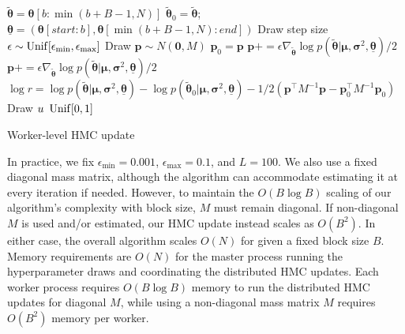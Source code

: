 \begin{algorithm}%

 $\bm{\tilde \theta} = \bm \theta[ b : \min(b + B - 1, N)]$\;
 $\bm{\tilde \theta}_0 = \bm{\tilde \theta}$;
 $\bm{\underline \theta} = (\bm \theta[start:b], \bm \theta[\min(b + B - 1, N):end])$\;
 Draw step size $\epsilon \sim \operatorname{Unif}[\epsilon_{\min}, \epsilon_{\max}]$\;
 Draw $\bm p \sim N(\bm 0, M)$\;
 $\bm p_0 = \bm p$\;
 $\bm p += \epsilon \nabla_{\bm{\tilde \theta}} \log p(\bm{\tilde \theta} | \bm \mu, \bm \sigma^2, \bm{\underline \theta}) / 2$\;
 $\bm p += \epsilon \nabla_{\bm{\tilde \theta}} \log p(\bm{\tilde \theta} | \bm \mu, \bm \sigma^2, \bm{\underline \theta}) / 2$\;
 $\log r = \log p(\bm{\tilde \theta} | \bm \mu, \bm \sigma^2, \bm{\underline \theta}) - \log p(\bm{\tilde \theta}_0 | \bm \mu, \bm \sigma^2, \bm{\underline \theta}) - 1/2( \bm p^\top M^{-1} \bm p - \bm p_0^\top M^{-1} \bm p_0)$\;
Draw $u ~ \operatorname{Unif}[0,1]$\;
 {
 
}
 \caption{Worker-level HMC update \label{supp:nucleosomes:alg:hmc}}
\end{algorithm}
%
In practice, we fix $\epsilon_{\min} = 0.001$, $\epsilon_{\max} = 0.1$, and $L = 100$.
We also use a fixed diagonal mass matrix, although the algorithm can accommodate estimating it at every iteration if needed.
However, to maintain the $O(B \log B)$ scaling of our algorithm's complexity with block size, $M$ must remain diagonal.
If non-diagonal $M$ is used and/or estimated, our HMC update instead scales as $O(B^2)$.
In either case, the overall algorithm scales $O(N)$ for given a fixed block size $B$.
%
Memory requirements are $O(N)$ for the master process running the hyperparameter draws and coordinating the distributed HMC updates.
Each worker process requires $O(B \log B)$ memory to run the distributed HMC updates for diagonal $M$, while using a non-diagonal mass matrix $M$ requires $O(B^2)$ memory per worker.


